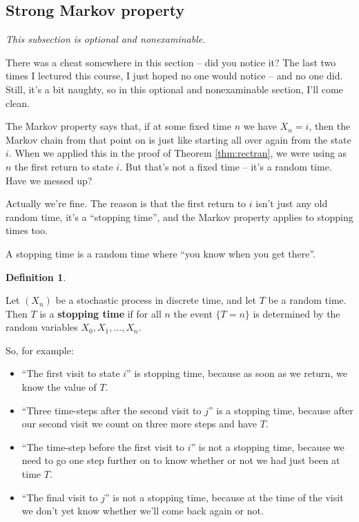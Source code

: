 \documentclass[
  a4paper,
]{article}
\providecommand{\tightlist}{%
  \setlength{\itemsep}{0pt}\setlength{\parskip}{0pt}}
\theoremstyle{definition}
\newtheorem{definition}{Definition}[section]
\theoremstyle{definition}
\theoremstyle{definition}
\theoremstyle{remark}
\begin{document}
\hypertarget{S09-strong-markov}{%
\subsection{Strong Markov property}\label{S09-strong-markov}}

\emph{This subsection is optional and nonexaminable.}

There was a cheat somewhere in this section -- did you notice it? The last two times I lectured this course, I just hoped no one would notice -- and no one did. Still, it's a bit naughty, so in this optional and nonexaminable section, I'll come clean.

The Markov property says that, if at some fixed time \(n\) we have \(X_n = i\), then the Markov chain from that point on is just like starting all over again from the state \(i\). When we applied this in the proof of Theorem \ref{thm:rectran}, we were using as \(n\) the first return to state \(i\). But that's not a fixed time -- it's a random time. Have we messed up?

Actually we're fine. The reason is that the first return to \(i\) isn't just any old random time, it's a ``stopping time'', and the Markov property applies to stopping times too.

A stopping time is a random time where ``you know when you get there''.

\begin{definition}
\protect\hypertarget{def:stopping}{}\label{def:stopping}

Let \((X_n)\) be a stochastic process in discrete time, and let \(T\) be a random time. Then \(T\) is a \textbf{stopping time} if for all \(n\) the event \(\{T = n\}\) is determined by the random variables \(X_0, X_1, \dots, X_n\).

\end{definition}

So, for example:

\begin{itemize}
\tightlist
\item
  ``The first visit to state \(i\)'' is stopping time, because as soon as we return, we know the value of \(T\).
\item
  ``Three time-steps after the second visit to \(j\)'' is a stopping time, because after our second visit we count on three more steps and have \(T\).
\item
  ``The time-step before the first visit to \(i\)'' is not a stopping time, because we need to go one step further on to know whether or not we had just been at time \(T\).
\item
  ``The final visit to \(j\)'' is not a stopping time, because at the time of the visit we don't yet know whether we'll come back again or not.
\end{itemize}
\end{document}
